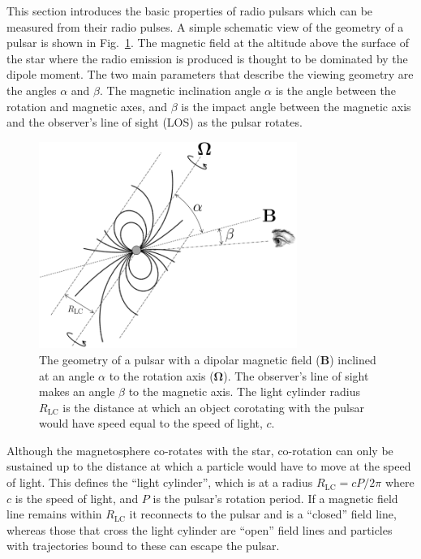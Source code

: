 This section introduces the basic properties of radio pulsars which can be measured from their radio pulses. A simple schematic view of the geometry of a pulsar is shown in Fig.~\ref{fig: intro - basic geometry}. The magnetic field at the altitude above the surface of the star where the radio emission is produced is thought to be dominated by the dipole moment. The two main parameters that describe the viewing geometry are the angles $\alpha$ and $\beta$. The magnetic inclination angle $\alpha$ is the angle between the rotation and magnetic axes, and $\beta$ is the impact angle between the magnetic axis and the observer's line of sight (LOS) as the pulsar rotates. 
\begin{figure}
    \begin{center}
        \includegraphics[width=0.75\textwidth]{Figures/Introduction/pulsar_geometry}
        \caption[The basic geometry of a radio pulsar]{The geometry of a pulsar with a dipolar magnetic field ($\mathbf{B}$) inclined at an angle $\alpha$ to the rotation axis ($\mathbf{\Omega}$). The observer's line of sight makes an angle $\beta$ to the magnetic axis. The light cylinder radius $R_\mathrm{LC}$ is the distance at which an object corotating with the pulsar would have speed equal to the speed of light, $c$.}
        \label{fig: intro - basic geometry}
    \end{center}
\end{figure}
Although the magnetosphere co-rotates with the star, co-rotation can only be sustained up to the distance at which a particle would have to move at the speed of light. This defines the ``light cylinder'', which is at a radius $R_\mathrm{LC} = cP/2\pi$ where $c$ is the speed of light, and $P$ is the pulsar's rotation period. If a magnetic field line remains within $R_\mathrm{LC}$ it reconnects to the pulsar and is a ``closed'' field line, whereas those that cross the light cylinder are ``open'' field lines and particles with trajectories bound to these can escape the pulsar.


